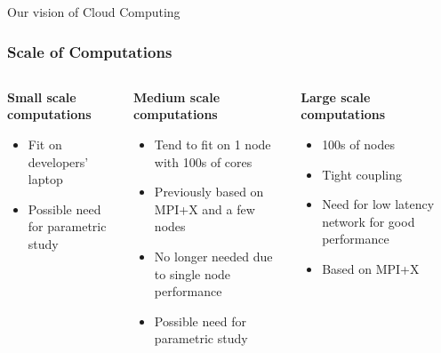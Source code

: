 \documentclass[10pt,aspectratio=1609]{beamer}
\begin{document}
\begin{section}{Our vision of Cloud Computing}
\begin{frame}
  \frametitle{Scale of Computations}

  \begin{columns}[T] %
    \begin{column}{0.33\textwidth}
      \textbf{Small scale computations}
      \begin{itemize}
        \item Fit on developers' laptop
        \item Possible need for parametric study
      \end{itemize}
    \end{column}
    \begin{column}{0.33\textwidth}
      \textbf{Medium scale computations}
      \begin{itemize}
        \item Tend to fit on 1 node with 100s of cores
        \item Previously based on MPI+X and a few nodes
        \item No longer needed due to single node performance
        \item Possible need for parametric study
      \end{itemize}
    \end{column}
    \begin{column}{0.33\textwidth}
      \textbf{Large scale computations}
      \begin{itemize}
        \item 100s of nodes
        \item Tight coupling
        \item Need for low latency network for good performance
        \item Based on MPI+X
      \end{itemize}
    \end{column}
  \end{columns}

\end{frame}



\end{section}
\end{document}
